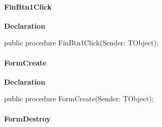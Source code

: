 \documentclass{report}
\newif\ifpdf
\begin{document}
\paragraph*{FinBtn1Click}\hspace*{\fill}

\label{mainunit.TIWizFrm-FinBtn1Click}
\begin{list}{}{
\setlength{\itemindent}{0cm}
\setlength{\listparindent}{0cm}
\setlength{\leftmargin}{\evensidemargin}
\addtolength{\leftmargin}{\tmplength}
\settowidth{\labelsep}{X}
\addtolength{\leftmargin}{\labelsep}
\setlength{\labelwidth}{\tmplength}
}
\item[\textbf{Declaration}\hfill]
\ifpdf
\begin{flushleft}
\fi
\begin{ttfamily}
public procedure FinBtn1Click(Sender: TObject);\end{ttfamily}

\ifpdf
\end{flushleft}
\fi

\end{list}
\paragraph*{FormCreate}\hspace*{\fill}

\label{mainunit.TIWizFrm-FormCreate}
\begin{list}{}{
\setlength{\itemindent}{0cm}
\setlength{\listparindent}{0cm}
\setlength{\leftmargin}{\evensidemargin}
\addtolength{\leftmargin}{\tmplength}
\settowidth{\labelsep}{X}
\addtolength{\leftmargin}{\labelsep}
\setlength{\labelwidth}{\tmplength}
}
\item[\textbf{Declaration}\hfill]
\ifpdf
\begin{flushleft}
\fi
\begin{ttfamily}
public procedure FormCreate(Sender: TObject);\end{ttfamily}

\ifpdf
\end{flushleft}
\fi

\end{list}
\paragraph*{FormDestroy}\hspace*{\fill}
\end{document}
